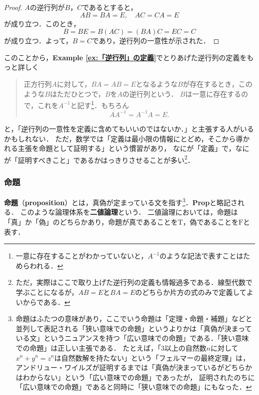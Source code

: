 \documentclass[a4paper,11pt]{ltjsarticle}
\renewcommand{\emph}[1]{\textbf{#1}}
\newenvironment{tleftbar}{\begin{tbleftline}\setlength{\parindent}{1\zw}}{\end{tbleftline}}
\newcommand{\exref}[1]{{\bfseries\sffamily Example \ref{ex:#1}}}
\begin{document}
\begin{tleftbar}
  \begin{proof}
    $A$の逆行列が$B$，$C$であるとすると，
    \[
      AB=BA=E,\quad AC=CA=E
    \]
    が成り立つ．このとき，
    \[
      B=BE=B(AC)=(BA)C=EC=C
    \]
    が成り立つ．よって，$B=C$であり，逆行列の一意性が示された．
  \end{proof}
\end{tleftbar}

このことから，\exref{「逆行列」の定義}でとりあげた逆行列の定義をもっと詳しく

\begin{quote}
  正方行列$A$に対して，$BA = AB =E$となるような$B$が存在するとき，このような$B$はただひとつで，$B$を$A$の逆行列という．
  $B$は一意に存在するので，これを$A^{-1}$と記す\footnote{一意に存在することがわかっていないと，$A^{-1}$のような記法で表すことはためらわれる．}．もちろん
  \[
    AA^{-1}=A^{-1}A=E.
  \]
\end{quote}
と，「逆行列の一意性を定義に含めてもいいのではないか．」と主張する人がいるかもしれない．
ただ，数学では「定義は最小限の情報にとどめ，そこから導かれる主張を命題として証明する」という慣習があり，
なにが「定義」で，なにが「証明すべきこと」であるかはっきりさせることが多い\footnote{ただ，実際はここで取り上げた逆行列の定義も情報過多である．線型代数で学ぶことになるが，$AB=E$と$BA=E$のどちらか片方の式のみで定義してよいからである．}．

\subsubsection{命題}

\emph{命題}（\emph{proposition}）とは，真偽が定まっている文を指す\footnote{命題はふたつの意味があり，ここでいう命題は「定理・命題・補題」などと並列して表記される「狭い意味での命題」というよりかは「真偽が決まっている文」というニュアンスを持つ「広い意味での命題」である．「狭い意味での命題」は正しい主張である．
  たとえば，「$3$以上の自然数$n$に対して$x^n + y^n =z^n$は自然数解を持たない」という「フェルマーの最終定理」は，
  アンドリュー・ワイルズが証明するまでは「真偽が決まっているがどちらかはわからない」という「広い意味での命題」であったが，
  証明されたのちに「広い意味での命題」であると同時に「狭い意味での命題」にもなった．}．\textbf{Prop}と略記される．
このような論理体系を\emph{二値論理}という．
二値論理においては，命題は「真」か「偽」のどちらかあり，命題が真であることを$\mathrm{T}$，偽であることを$\mathrm{F}$と表す．
\end{document}
